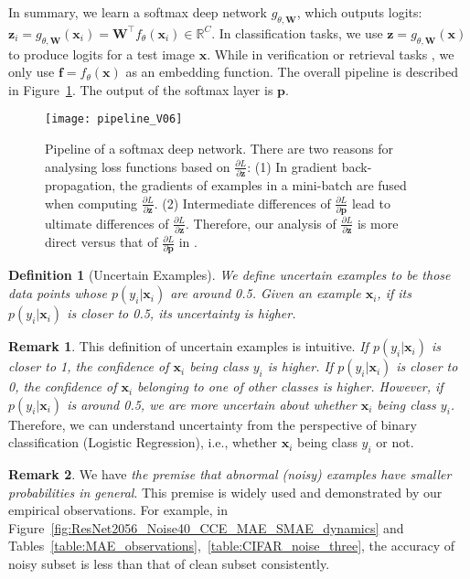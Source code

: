 \documentclass{article}
\begin{document}
In summary, we learn a softmax deep network $g_{\theta, \mathbf{W}}$, which outputs logits: $\mathbf{z}_i = g_{\theta, \mathbf{W}}(\mathbf{x}_i)=\mathbf{W}^\top f_{\theta}(\mathbf{x}_i) \in \mathbb{R}^C.$
In classification tasks, 
we use $\mathbf{z}=g_{\theta, \mathbf{W}}(\mathbf{x})$ to produce logits for a test image $\mathbf{x}$. 
While in verification or retrieval tasks \cite{wang2019ranked,wang2019deep,wang2019id}, we only use 
$\mathbf{f}=f_{\theta}(\mathbf{x})$ as an embedding function. 
The overall pipeline is described in Figure~\ref{fig:embedding_pipeline}.
The output of the softmax layer is $\mathbf{p}$.
\begin{figure}[!t]
	\centering
	\vspace{-0.22cm}
	\texttt{[image: pipeline\_V06]}
	\caption{
		Pipeline of a softmax deep network. There are two reasons for analysing loss functions based on $\frac{\partial L}{\partial \mathbf{z}}$: (1) 
In gradient back-propagation, the gradients of examples in a mini-batch are fused when computing $\frac{\partial L}{\partial \mathbf{z}}$.  
		(2) 
		Intermediate differences of $\frac{\partial L}{\partial \mathbf{p}}$ lead to ultimate differences of $\frac{\partial L}{\partial \mathbf{z}}$.
Therefore, our analysis of $\frac{\partial L}{\partial \mathbf{z}}$ is more direct versus that of $\frac{\partial L}{\partial \mathbf{p}}$ in  \cite{zhang2018generalized}.
}
	\label{fig:embedding_pipeline}
	\vspace{-0.32cm}
\end{figure}


\textbf{Definition 1} (Uncertain Examples). \textit{We define uncertain examples to be those data points whose $p(y_i|\mathbf{x}_i)$ are around 0.5. Given an example $\mathbf{x}_i$, if its $p(y_i|\mathbf{x}_i)$ is closer to 0.5, its uncertainty is higher.}



\textbf{Remark 1}. 
This definition of uncertain examples is intuitive. \textit{If $p(y_i|\mathbf{x}_i)$ is closer to 1, the confidence of $\mathbf{x}_i$ being class $y_i$ is higher. If $p(y_i|\mathbf{x}_i)$ is closer to 0, the confidence of $\mathbf{x}_i$ belonging to one of other classes is higher. However, if $p(y_i|\mathbf{x}_i)$ is around 0.5, we are more uncertain about whether $\mathbf{x}_i$ being class $y_i$.}
Therefore, we can understand uncertainty from the perspective of binary classification (Logistic Regression), i.e., whether $\mathbf{x}_i$ being class $y_i$ or not. 

\textbf{Remark 2}. 
We have \textit{the premise that abnormal (noisy) examples have smaller probabilities in general}. This premise is widely used and demonstrated by our empirical observations. For example, in Figure~\ref{fig:ResNet2056_Noise40_CCE_MAE_SMAE_dynamics} and Tables~\ref{table:MAE_observations},~\ref{table:CIFAR_noise_three}, the accuracy of noisy subset is less than that of clean subset consistently.    
\end{document}
